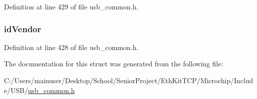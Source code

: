 Definition at line 429 of file usb\+\_\+common.\+h.

\hypertarget{struct__override__client__driver__data_aa6705f738420468e35fa0bcc980ef1d8}{}
\subsubsection[{id\+Vendor}]{ id\+Vendor}\label{struct__override__client__driver__data_aa6705f738420468e35fa0bcc980ef1d8}


Definition at line 428 of file usb\+\_\+common.\+h.



The documentation for this struct was generated from the following file\+:\begin{DoxyCompactItemize}
\item 
C\+:/\+Users/mainuser/\+Desktop/\+School/\+Senior\+Project/\+Eth\+Kit\+T\+C\+P/\+Microchip/\+Include/\+U\+S\+B/\hyperlink{usb__common_8h}{usb\+\_\+common.\+h}\end{DoxyCompactItemize}
